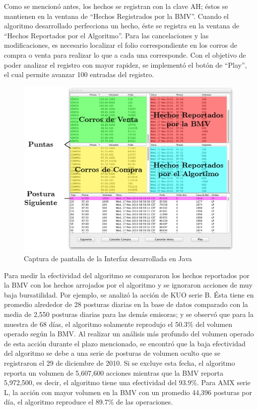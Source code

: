 \documentclass[11pt]{article}
\numberwithin{equation}{section} %
\begin{document}
Como se mencionó antes, los hechos se registran con la clave AH; éstos se mantienen en la ventana de ``Hechos Registrados por la BMV''. Cuando el algoritmo desarrollado perfecciona un hecho, éste se registra en la ventana de ``Hechos Reportados por el Algoritmo''. Para las cancelaciones y las modificaciones, es necesario localizar el folio correspondiente en los corros de compra o venta para realizar lo que a cada una corresponde. Con el objetivo de poder analizar el registro con mayor rapidez, se implementó el botón de ``Play'', el cual permite avanzar 100 entradas del registro.

\begin{landscape}

\begin{figure}[htbp] \centering
\includegraphics{screenshot.png}
\caption{Captura de pantalla de la Interfaz desarrollada en Java}
\label{java}
\end{figure}

\end{landscape}

Para medir la efectividad del algoritmo se compararon los hechos reportados por la BMV con los hechos arrojados por el algoritmo y se ignoraron acciones de muy baja bursatilidad. Por ejemplo, se analizó la acción de KUO serie B. Ésta tiene en promedio alrededor de 28 posturas diarias en la base de datos comparado con la media de 2,550 posturas diarias para las demás emisoras; y se observó que para la muestra de 68 días, el algoritmo solamente reprodujo el 50.3\% del volumen operado según la BMV. Al realizar un análisis más profundo del volumen operado de esta acción durante el plazo mencionado, se encontró que la baja efectividad del algoritmo se debe a una serie de posturas de volumen oculto que se registraron el 29 de diciembre de 2010. Si se excluye esta fecha, el algoritmo reporta un volumen de 5,607,600 acciones mientras que la BMV reporta 5,972,500, es decir, el algoritmo tiene una efectividad del 93.9\%. Para AMX serie L, la acción con mayor volumen en la BMV con un promedio 44,396 posturas por día, el algoritmo reproduce el 89.7\% de las operaciones.\\
\end{document}

